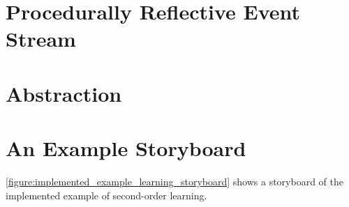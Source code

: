 \section{Procedurally Reflective Event Stream}



\section{Abstraction}



\section{An Example Storyboard}

{\mbox{\autoref{figure:implemented_example_learning_storyboard}}}
shows a storyboard of the implemented example of second-order
learning.
